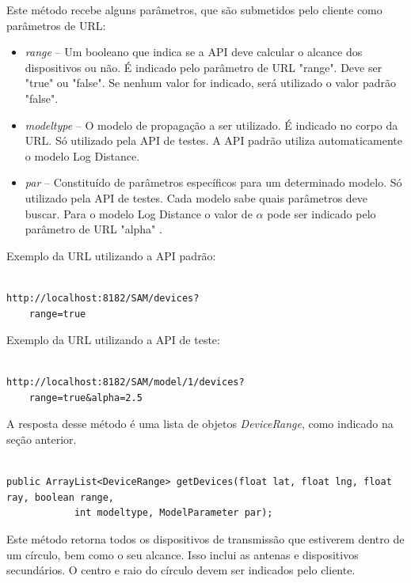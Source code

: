 Este método recebe alguns parâmetros, que são submetidos pelo cliente como parâmetros de URL:

\begin{itemize}
\item \textit{range} -- Um booleano que indica se a API deve calcular o alcance dos dispositivos ou não. É indicado pelo parâmetro de URL "range". Deve ser "true" ou "false". Se nenhum valor for indicado, será utilizado o valor padrão "false".
\item \textit{modeltype} -- O modelo de propagação a ser utilizado. É indicado no corpo da URL. Só utilizado pela API de testes. A API padrão utiliza automaticamente o modelo Log Distance.
\item \textit{par} -- Constituído de parâmetros específicos para um determinado modelo. Só utilizado pela API de testes. Cada modelo sabe quais parâmetros deve buscar. Para o modelo Log Distance o valor de \begin{math} \alpha \end{math} pode ser indicado pelo parâmetro de URL "alpha" .
\end{itemize}

Exemplo da URL utilizando a API padrão:

\begin{lstlisting}	

http://localhost:8182/SAM/devices?
	range=true

\end{lstlisting}

Exemplo da URL utilizando a API de teste:

\begin{lstlisting}			

http://localhost:8182/SAM/model/1/devices?
	range=true&alpha=2.5

\end{lstlisting}


A resposta desse método é uma lista de objetos \textit{DeviceRange}, como indicado na seção anterior.


\begin{lstlisting}	

public ArrayList<DeviceRange> getDevices(float lat, float lng, float ray, boolean range, 
			int modeltype, ModelParameter par);

\end{lstlisting}


Este método retorna todos os dispositivos de transmissão que estiverem dentro de um círculo, bem como o seu alcance. Isso inclui as antenas e dispositivos secundários. O centro e raio do círculo devem ser indicados pelo cliente.

